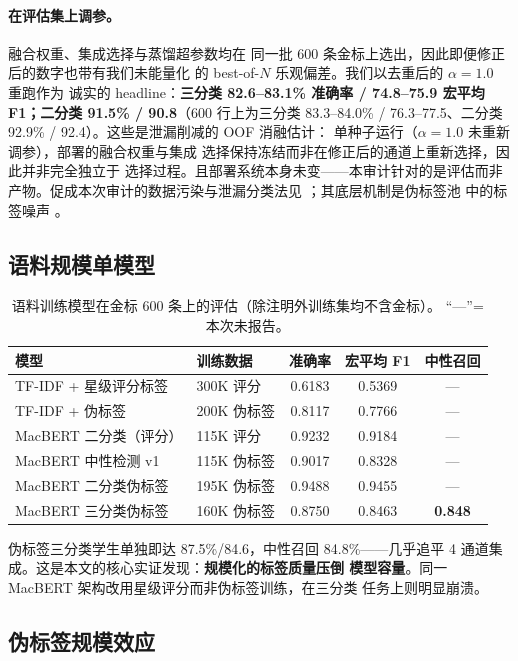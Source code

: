 \documentclass[11pt,a4paper]{article}
\begin{document}
\paragraph{在评估集上调参。} 融合权重、集成选择与蒸馏超参数均在
同一批 600 条金标上选出，因此即便修正后的数字也带有我们未能量化
的 best-of-$N$ 乐观偏差。我们以去重后的 $\alpha{=}1.0$ 重跑作为
诚实的 headline：\textbf{三分类 82.6--83.1\% 准确率 / 74.8--75.9
宏平均 F1；二分类 91.5\% / 90.8}（600 行上为三分类 83.3--84.0\% /
76.3--77.5、二分类 92.9\% / 92.4）。这些是泄漏削减的 OOF 消融估计：
单种子运行（$\alpha{=}1.0$ 未重新调参），部署的融合权重与集成
选择保持冻结而非在修正后的通道上重新选择，因此并非完全独立于
选择过程。且部署系统本身未变——本审计针对的是评估而非
产物。促成本次审计的数据污染与泄漏分类法见
\citet{sainz2023,kapoor2023,balloccu2024}；其底层机制是伪标签池
中的标签噪声 \citep{northcutt2021}。

\subsection{语料规模单模型}

\begin{table}[H]
\centering\small
\caption{语料训练模型在金标 600 条上的评估（除注明外训练集均不含金标）。
“---”= 本次未报告。}
\label{tab:corpus}
\begin{tabular}{llccc}
\toprule
模型 & 训练数据 & 准确率 & 宏平均 F1 & 中性召回 \\
\midrule
TF-IDF + 星级评分标签   & 300K 评分  & 0.6183 & 0.5369 & ---    \\
TF-IDF + 伪标签         & 200K 伪标签 & 0.8117 & 0.7766 & ---    \\
MacBERT 二分类（评分）   & 115K 评分  & 0.9232 & 0.9184 & ---    \\
MacBERT 中性检测 v1     & 115K 伪标签 & 0.9017 & 0.8328 & ---    \\
MacBERT 二分类伪标签     & 195K 伪标签 & 0.9488 & 0.9455 & ---    \\
MacBERT 三分类伪标签     & 160K 伪标签 & 0.8750 & 0.8463 & \textbf{0.848} \\
\bottomrule
\end{tabular}
\end{table}

伪标签三分类学生单独即达 87.5\%/84.6，中性召回 84.8\%——几乎追平
4 通道集成。这是本文的核心实证发现：\textbf{规模化的标签质量压倒
模型容量}。同一 MacBERT 架构改用星级评分而非伪标签训练，在三分类
任务上则明显崩溃。

\subsection{伪标签规模效应}
\end{document}
